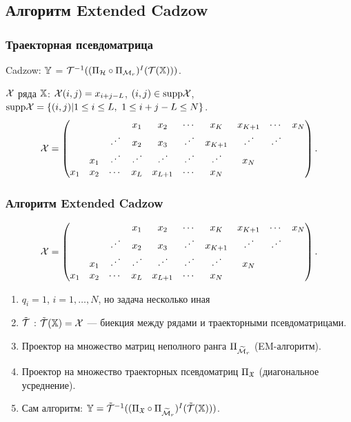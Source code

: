 \documentclass[unicode, notheorems]{beamer}
\begin{document}
\subsection{Алгоритм Extended Cadzow}

\begin{frame}
    \frametitle{Траекторная псевдоматрица}
    \small{
     Cadzow: $\mathbb{Y}$ = $\mathcal{T}^{-1}((\Pi_{\mathcal{H}} \circ \Pi_{\mathcal{M}_r})^I(\mathcal{T}(\mathbb{X})))$.
    \vspace{0.4cm}

 $\mathcal{X}$ ряда $\mathbb{X}$: $\mathcal{X}(i, j) = x_{i+j-L}$, $(i,j) \in \text{supp} \mathcal{X}$, $\text{supp} \mathcal{X} = \{(i,j) | 1 \le i \le L,\ 1 \le i+j-L \le N\}$.
    \begin{equation*}
    \mathcal{X} = \begin{pmatrix}
     &  &  & x_1 & x_2 & \cdots & x_K & x_{K+1} & \cdots & x_N \\ 
     &  & \iddots & x_2 & x_3 & \iddots & x_{K+1} & \iddots & \iddots &  \\ 
     & x_1 & \iddots & \iddots & \iddots & \iddots & \iddots & x_N &  &  \\ 
    x_1 & x_2 & \cdots & x_L & x_{L+1} & \cdots & x_N &  &  & 
    \end{pmatrix}.
    \end{equation*}

}
\end{frame}

\begin{frame}
    \frametitle{Алгоритм Extended Cadzow}
    \begin{equation*}
    \mathcal{X} = \begin{pmatrix}
     &  &  & x_1 & x_2 & \cdots & x_K & x_{K+1} & \cdots & x_N \\ 
     &  & \iddots & x_2 & x_3 & \iddots & x_{K+1} & \iddots & \iddots &  \\ 
     & x_1 & \iddots & \iddots & \iddots & \iddots & \iddots & x_N &  &  \\ 
    x_1 & x_2 & \cdots & x_L & x_{L+1} & \cdots & x_N &  &  & 
    \end{pmatrix}.
    \end{equation*}
    \begin{enumerate}
    \item $q_i = 1$, $i = 1, \ldots, N$, но задача несколько иная
    \item $\tilde {\mathcal{T}}$ : $\tilde {\mathcal{T}}(\mathbb{X}) = \mathcal{X}$ --- биекция между рядами и траекторными псевдоматрицами.
    \item Проектор на множество матриц неполного ранга $\Pi_{\widetilde {\mathcal{M}}_r}$ (EM-алгоритм).
    \item Проектор на множество траекторных псевдоматриц $\Pi_{\mathfrak{X}}$ (диагональное усреднение).
    \item Сам алгоритм: $\mathbb{Y} = \tilde {\mathcal{T}}^{-1}((\Pi_{\mathfrak{X}} \circ \Pi_{\widetilde {\mathcal{M}}_r})^I (\tilde {\mathcal{T}}(\mathbb{X})))$.
    \end{enumerate}
\end{frame}
\end{document}
